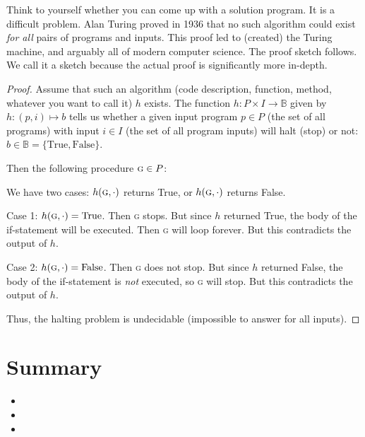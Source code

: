 \documentclass[main.tex]{subfiles}
\begin{document}
Think to yourself whether you can come up with a solution program. It is a difficult problem. Alan Turing proved in 1936 that no such algorithm could exist \textit{for all} pairs of programs and inputs. This proof led to (created) the Turing machine, and arguably all of modern computer science. The proof sketch follows. We call it a sketch because the actual proof is significantly more in-depth.

\begin{proof}
	Assume that such an algorithm (code description, function, method, whatever you want to call it) \(h\) exists. The function \(h : P \times I \rightarrow \mathbb{B}\) given by \(h : (p,i) \mapsto b\) tells us whether a given input program \(p \in P\) (the set of all programs) with input \(i \in I\) (the set of all program inputs) will halt (stop) or not: \(b \in \mathbb{B} = \{\text{True}, \text{False}\}\).
	
	Then the following procedure \(\textsc{g} \in P\):
	\begin{algorithmic}[1]
				\EndWhile
			\EndIf
		\EndFunction
	\end{algorithmic}
	
	We have two cases: \(h(\textsc{g},\cdot)\) returns True, or \(h(\textsc{g},\cdot)\) returns False.
	
	Case 1: \(h(\textsc{g},\cdot) = \text{True}\). Then \textsc{g} stops. But since \(h\) returned True, the body of the if-statement will be executed. Then \textsc{g} will loop forever. But this contradicts the output of \(h\).
	
	Case 2: \(h(\textsc{g},\cdot) = \text{False}\). Then \textsc{g} does not stop. But since \(h\) returned False, the body of the if-statement is \textit{not} executed, so \textsc{g} will stop. But this contradicts the output of \(h\).
	
	Thus, the halting problem is undecidable (impossible to answer for all inputs).
\end{proof}


\section{Summary}

\begin{itemize}
	\item 
	\item 
	\item 
\end{itemize}
\end{document}
